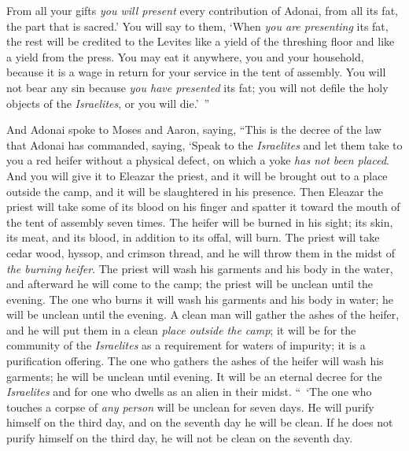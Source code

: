 \begin{biblechapter}
\verse From all your gifts \textit{you will present} every contribution of Adonai, from all its fat, the part that is sacred.’
\verse You will say to them, ‘When \textit{you are presenting} its fat, the rest will be credited to the Levites like a yield of the threshing floor and like a yield from the press.
\verse You may eat it anywhere, you and your household, because it is a wage in return for your service in the tent of assembly.
\verse You will not bear any sin because \textit{you have presented} its fat; you will not defile the holy objects of the \textit{Israelites}, or you will die.’ ”
\end{biblechapter}

\begin{biblechapter} %
 And Adonai spoke to Moses and Aaron, saying,
\verse “This is the decree of the law that Adonai has commanded, saying, ‘Speak to the \textit{Israelites} and let them take to you a red heifer without a physical defect, on which a yoke \textit{has not been placed}.
\verse And you will give it to Eleazar the priest, and it will be brought out to a place outside the camp, and it will be slaughtered in his presence.
\verse Then Eleazar the priest will take some of its blood on his finger and spatter it toward the mouth of the tent of assembly seven times.
\verse The heifer will be burned in his sight; its skin, its meat, and its blood, in addition to its offal, will burn.
\verse The priest will take cedar wood, hyssop, and crimson thread, and he will throw them in the midst of \textit{the burning heifer}.
\verse The priest will wash his garments and his body in the water, and afterward he will come to the camp; the priest will be unclean until the evening.
\verse The one who burns it will wash his garments and his body in water; he will be unclean until the evening.
\verse A clean man will gather the ashes of the heifer, and he will put them in a clean \textit{place outside the camp}; it will be for the community of the \textit{Israelites} as a requirement for waters of impurity; it is a purification offering.
\verse The one who gathers the ashes of the heifer will wash his garments; he will be unclean until evening. It will be an eternal decree for the \textit{Israelites} and for one who dwells as an alien in their midst.
\verse “ ‘The one who touches a corpse of \textit{any person} will be unclean for seven days.
\verse He will purify himself on the third day, and on the seventh day he will be clean. If he does not purify himself on the third day, he will not be clean on the seventh day.

\end{biblechapter}
